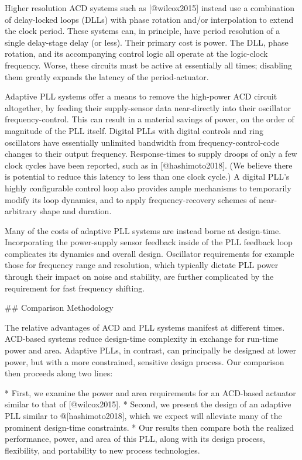 \documentclass[twoside,9pt,journal,letterpage]{IEEEtran}
\begin{document}
Higher resolution ACD systems such as [@wilcox2015] instead use a combination of delay-locked loops (DLLs) with phase rotation and/or interpolation to extend the clock period. These systems can, in principle, have period resolution of a single delay-stage delay (or less). Their primary cost is power. The DLL, phase rotation, and its accompanying control logic all operate at the logic-clock frequency. Worse, these circuits must be active at essentially all times; disabling them greatly expands the latency of the period-actuator. 

Adaptive PLL systems offer a means to remove the high-power ACD circuit altogether, by feeding their supply-sensor data near-directly into their oscillator frequency-control. This can result in a material savings of power, on the order of magnitude of the PLL itself. Digital PLLs with digital controls and ring oscillators have essentially unlimited bandwidth from frequency-control-code changes to their output frequency. Response-times to supply droops of only a few clock cycles have been reported, such as in [@hashimoto2018]. (We believe there is potential to reduce this latency to less than one clock cycle.) A digital PLL's highly configurable control loop also provides ample mechanisms to temporarily modify its loop dynamics, and to apply frequency-recovery schemes of near-arbitrary shape and duration. 

Many of the costs of adaptive PLL systems are instead borne at design-time. Incorporating the power-supply sensor feedback inside of the PLL feedback loop complicates its dynamics and overall design. Oscillator requirements for example those for frequency range and resolution, which typically dictate PLL power through their impact on noise and stability, are further complicated by the requirement for fast frequency shifting. 

## Comparison Methodology

The relative advantages of ACD and PLL systems manifest at different times. ACD-based systems reduce design-time complexity in exchange for run-time power and area. Adaptive PLLs, in contrast, can principally be designed at lower power, but with a more constrained, sensitive design process. Our comparison then proceeds along two lines:

* First, we examine the power and area requirements for an ACD-based actuator similar to that of [@wilcox2015].
* Second, we present the design of an adaptive PLL similar to @[hashimoto2018], which we expect will alleviate many of the prominent design-time constraints. 
* Our results then compare both the realized performance, power, and area of this PLL, along with its design process, flexibility, and portability to new process technologies. 
\end{document}
